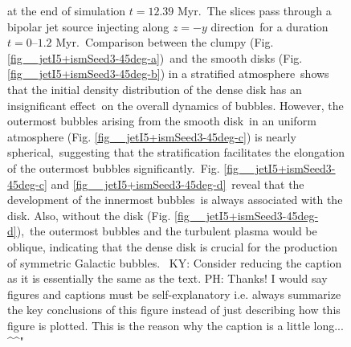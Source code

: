 \documentclass[fleqn,usenatbib,useAMS]{mnras}
\begin{document}
\begin{figure}
{             at the end of simulation $t=12.39$ Myr.\
             The slices pass through a bipolar jet source injecting along $z=-y$ direction\
             for a duration $t=0$--$1.2$ Myr.\
             Comparison between the clumpy (Fig. \ref{fig__jetI5+ismSeed3-45deg-a})\
             and the smooth disks (Fig. \ref{fig__jetI5+ismSeed3-45deg-b}) in a stratified atmosphere\
             shows that the initial density distribution of the dense disk has an insignificant effect\
             on the overall dynamics of bubbles. However, the outermost bubbles arising from the smooth disk\
             in an uniform atmosphere (Fig. \ref{fig__jetI5+ismSeed3-45deg-c}) is nearly spherical,\
             suggesting that the stratification facilitates the elongation of the outermost bubbles significantly.\
             Fig. \ref{fig__jetI5+ismSeed3-45deg-c} and \ref{fig__jetI5+ismSeed3-45deg-d}\
             reveal that the development of the innermost bubbles\
             is always associated with the disk. Also, without the disk (Fig. \ref{fig__jetI5+ismSeed3-45deg-d}),\
             the outermost bubbles and the turbulent plasma would be oblique,
             indicating that the dense disk is crucial for the production of symmetric Galactic bubbles.\ {\color{red} KY: Consider reducing the caption as it is essentially the same as the text. PH: Thanks! I would say figures and captions must be self-explanatory i.e. always summarize the key conclusions of this figure instead of just describing how this figure is plotted. This is the reason why the caption is a little long... \textasciicircum\textasciicircum"}
      }
      \label{fig__jetI5+ismSeed3-45deg}
 \end{figure}%
\end{document}
